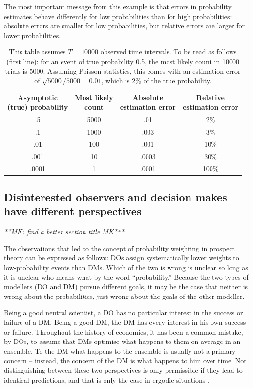 \documentclass[a4paper, 12pt]{article}
\newcommand{\tlabel}[1]{\label{tab:#1}}
\newcommand{\seclabel}[1]{\label{sec:#1}}
\newcommand{\MK}[1]{{\it ***MK: #1 MK***}}
\begin{document}
The most important message from this example is that errors in probability estimates behave differently for low probabilities than for high probabilities: absolute errors are smaller for low probabilities, but relative errors are larger for lower probabilities.

\begin{table}[!htb]
\centering
\begin{tabular}{@{}cccc@{}}
\toprule[2pt]
\makecell{Asymptotic\\(true) probability} & \makecell{Most likely\\count} & \makecell{Absolute\\estimation error} & \makecell{Relative\\estimation error}\\
\midrule[2pt]
.5 & 5000 & .01 & 2\%\\
.1 & 1000& .003 & 3\%\\
.01 & 100& .001 & 10\%\\
.001 & 10& .0003& 30\%\\
.0001 & 1& .0001 &100\%\\
\bottomrule[2pt]
\end{tabular}
\caption{This table assumes $T = 10000$ observed time intervals. To be read as follows (first line): for an event of true probability 0.5, the most likely count in 10000 trials is 5000. Assuming Poisson statistics, this comes with an estimation error of $\sqrt{5000}/5000=0.01$, which is 2\% of the true probability.}\tlabel{errors}
\end{table}

\subsection{Disinterested observers and decision makes have different perspectives \seclabel{condition2}}
\MK{find a better section title}

The observations that led to the concept of probability weighting in prospect theory can be expressed as follows: DOs assign systematically lower weights to low-probability events than DMs.
Which of the two is wrong is unclear so long as it is unclear who means what by the word ``probability.'' Because the two types of modellers (DO and DM) pursue different goals, it may be the case that neither is wrong about the probabilities, just wrong about the goals of the other modeller.

Being a good neutral scientist, a DO has no particular interest in the success or failure of a DM. Being a good DM, the DM has every interest in his own success or failure. Throughout the history of economics, it has been a common mistake, by DOs, to assume that DMs optimise what happens to them on average in an ensemble. To the DM what happens to the ensemble is usually not a primary concern -- instead, the concern of the DM is what happens to him over time. Not distinguishing between these two perspectives is only permissible if they lead to identical predictions, and that is only the case in ergodic situations \cite{Peters2019b}. 
\end{document}

